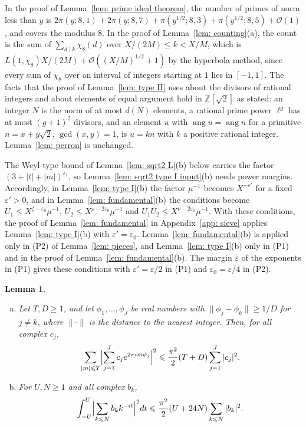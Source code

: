 \documentclass{article}
\numberwithin{equation}{section}
\newtheorem{lemma}{Lemma}
\newcommand{\Le}{\leqslant}
\newcommand{\Ge}{\geqslant}
\begin{document}
In the proof of Lemma~\ref{lem: prime ideal theorem}, the number of primes of norm less than $y$ is $2\pi(y; 8, 1) + 2\pi(y; 8, 7) + \pi(y^{1/2}; 8, 3) + \pi(y^{1/2}; 8, 5) + \mathcal{O}(1)$, and \citet[Section~1.2]{thorner2024refinements} covers the modulus $8$. In the proof of Lemma~\ref{lem: counting}(a), the count is the sum of $\sum_{d \mid k} \chi_8(d)$ over $X/(2M) \Le k < X/M$, which is $L(1, \chi_8) X/(2M) + \mathcal{O}((X/M)^{1/2} + 1)$ by the hyperbola method, since every sum of $\chi_8$ over an interval of integers starting at $1$ lies in $[-1, 1]$. The facts that the proof of Lemma~\ref{lem: type II} uses about the divisors of rational integers and about elements of equal argument hold in $\mathbb{Z}[\sqrt{2}]$ as stated: an integer $N$ is the norm of at most $d(N)$ elements, a rational prime power $\ell^g$ has at most $(g + 1)^2$ divisors, and an element $u$ with $\operatorname{ang} u = \operatorname{ang} n$ for a primitive $n = x + y\sqrt{2}$, $\gcd(x, y) = 1$, is $u = kn$ with $k$ a positive rational integer. Lemma~\ref{lem: perron} is unchanged.

The Weyl-type bound of Lemma~\ref{lem: sqrt2 L}(b) below carries the factor $(3 + |t| + |m|)^{\varepsilon_1}$, so Lemma~\ref{lem: sqrt2 type I input}(b) needs power margins. Accordingly, in Lemma~\ref{lem: type I}(b) the factor $\mu^{-1}$ becomes $X^{-\varepsilon'}$ for a fixed $\varepsilon' > 0$, and in Lemma~\ref{lem: fundamental}(b) the conditions become $U_1 \Le X^{\zeta - \varepsilon_0}\mu^{-1}$, $U_2 \Le X^{\rho - 2\varepsilon_0}\mu^{-1}$ and $U_1U_2 \Le X^{\nu - 2\varepsilon_0}\mu^{-1}$. With these conditions, the proof of Lemma~\ref{lem: fundamental} in Appendix~\ref{app: sieve} applies Lemma~\ref{lem: type I}(b) with $\varepsilon' = \varepsilon_0$. Lemma~\ref{lem: fundamental}(b) is applied only in (P2) of Lemma~\ref{lem: pieces}, and Lemma~\ref{lem: type I}(b) only in (P1) and in the proof of Lemma~\ref{lem: fundamental}(b). The margin $\varepsilon$ of the exponents in (P1) gives these conditions with $\varepsilon' = \varepsilon/2$ in (P1) and $\varepsilon_0 = \varepsilon/4$ in (P2).

\begin{lemma}
\label{lem: sqrt2 large sieve}
\begin{enumerate}[(a)]
\item Let $T, D \Ge 1$, and let $\phi_1, \dots, \phi_J$ be real numbers with $\|\phi_j - \phi_k\| \Ge 1/D$ for $j \neq k$, where $\|\cdot\|$ is the distance to the nearest integer. Then, for all complex $c_j$,
\begin{equation*}
\sum_{|m| \Le T} \Bigl| \sum_{j=1}^{J} c_j e^{2\pi i m \phi_j} \Bigr|^2 \Le \frac{\pi^2}{2} (T + D) \sum_{j=1}^{J} |c_j|^2.
\end{equation*}
\item For $U, N \Ge 1$ and all complex $b_k$,
\begin{equation*}
\int_{-U}^{U} \Bigl| \sum_{k \Le N} b_k k^{-it} \Bigr|^2 dt \Le \frac{\pi^2}{2} (U + 24N) \sum_{k \Le N} |b_k|^2.
\end{equation*}
\end{enumerate}
\end{lemma}
\end{document}

